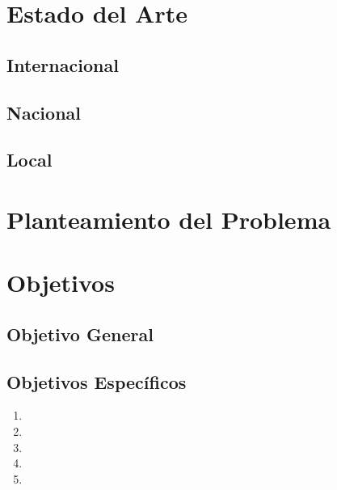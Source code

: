 \documentclass[12pt]{article}
\begin{document}
\section{Estado del Arte}

\subsection{Internacional}

\subsection{Nacional}

\subsection{Local}

\section{Planteamiento del Problema}

\section{Objetivos}

\subsection{Objetivo General}

\subsection{Objetivos Específicos}
\begin{enumerate}
    \item 
    \item 
    \item 
    \item 
    \item 
\end{enumerate}
\end{document}
